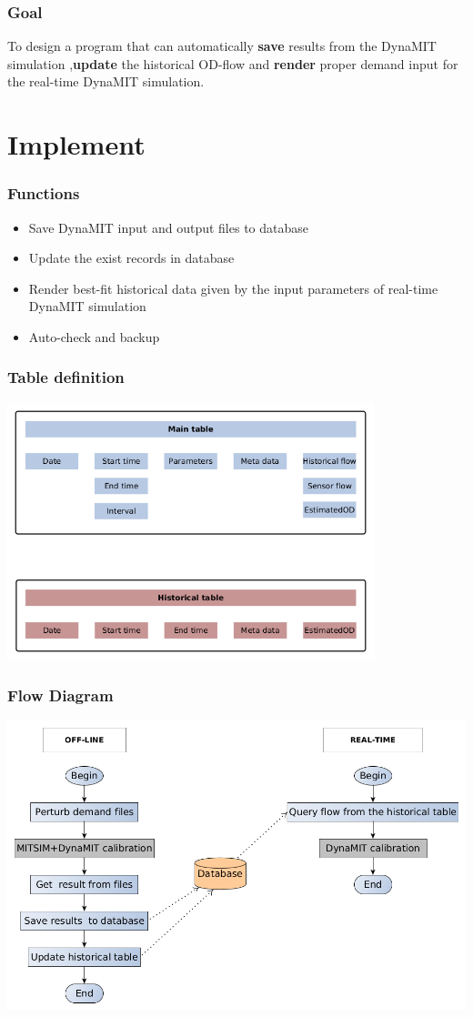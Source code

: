 \documentclass[12pt]{beamer}
\begin{document}
\begin{frame}
\frametitle{Goal}
To design a program that can automatically \textbf{save} results from the DynaMIT simulation ,\textbf{update} the historical OD-flow and \textbf{render} proper demand input for the real-time DynaMIT simulation.
\end{frame}


\section{Implement}
\begin{frame}
\frametitle{Functions}
\begin{itemize}
\item Save DynaMIT input and output files to database
\item Update the exist records in database
\item Render best-fit historical data given by the input parameters of real-time DynaMIT simulation
\item Auto-check and backup
\end{itemize}
\end{frame}


\begin{frame}
\frametitle{Table definition}
\includegraphics[width = 0.8\textwidth]{table.png}
\end{frame}

\begin{frame}
\frametitle{Flow Diagram}
\includegraphics[width = 1.0\textwidth]{flow-chart.png}
\end{frame}
\end{document}
